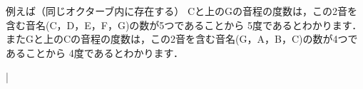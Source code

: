 \documentclass[dvipdfmx,uplatex,b5paper,openany,jbase=12Q,nomag*,textwidth-limit=44%
               ]{gachimuchi}
\begin{document}
\begin{Music}
  \nostartrule%
  \Startpiece%
  \Notes%
  \Mryaku\sk%
  \en\doublebar
  \Notes{}%
  \en\setdoublebar
  \endpiece%
\end{Music}

例えば（同じオクターブ内に存在する） Cと上のGの音程の度数は，この2音を含む音名(C，D，E，F，G)の数が5つであることから
5度であるとわかります．
またGと上のCの音程の度数は，この2音を含む音名(G，A，B，C)の数が4つであることから
4度であるとわかります．
\begin{Music}[.5\linewidth]
  \nostartrule%
  \Startpiece%
  \notes{}\multnoteskip{\tinyvalue}%
  \tinynotesize
  \en\Notes
  \en\bar%
  \Notes{}\multnoteskip{\tinyvalue}%
  \tinynotesize
  \en\Notes
  \en
  \endpiece%
\end{Music}
\end{document}
